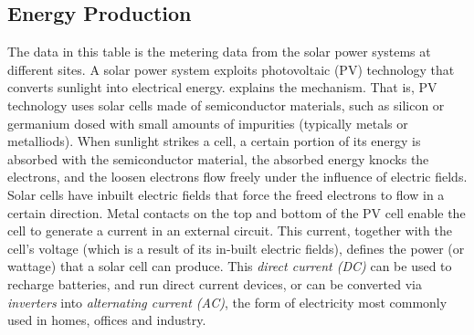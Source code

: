 \documentclass[a4paper,12pt]{llncs}
\begin{document}
\subsection{Energy Production}
The data in this table is the metering data from the solar power systems at different sites. A solar power system exploits photovoltaic (PV) technology that converts sunlight into electrical energy.  \cite{solarsys} explains the mechanism. That is, PV technology uses solar cells made of semiconductor materials, such as silicon or germanium dosed with small amounts of impurities (typically metals or metalliods). When sunlight strikes a cell, a certain portion of its energy is absorbed with the semiconductor material, the absorbed energy knocks the electrons, and the loosen electrons flow freely under the influence of electric fields. Solar cells have inbuilt electric fields that force the freed electrons to flow in a certain direction. Metal contacts on the top and bottom of the PV cell enable the cell to generate a current in an external circuit. This current, together with the cell's voltage (which is a result of its in-built electric fields), defines the power (or wattage) that a solar cell can produce. This {\em direct current (DC)} can be used to recharge batteries, and run direct current devices, or can be converted via {\em inverters} into {\em alternating current (AC)}, the form of electricity most commonly used in homes, offices and industry.  
\end{document}
